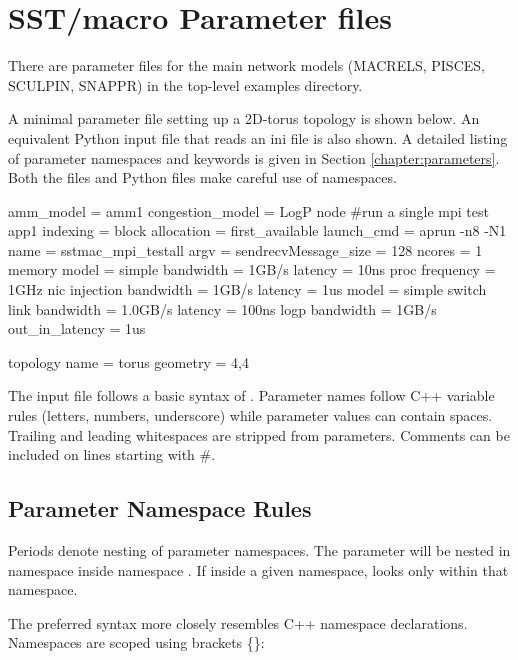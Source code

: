 
\section{SST/macro Parameter files}

There are parameter files for the main network models (MACRELS, PISCES, SCULPIN, SNAPPR) in the top-level examples directory.

\label{sec:parameters}
A minimal parameter file setting up a 2D-torus topology is shown below. 
An equivalent Python input file that reads an ini file is also shown.
A detailed listing of parameter namespaces and keywords is given in Section \ref{chapter:parameters}.
Both the  files and Python files make careful use of namespaces.

\begin{ViFile}
amm_model = amm1
congestion_model = LogP
node {
 #run a single mpi test
 app1 {
  indexing = block
  allocation = first_available
  launch_cmd = aprun -n8 -N1
  name = sstmac_mpi_testall
  argv =
  sendrecvMessage_size = 128
 }
 ncores = 1
 memory {
  model = simple
  bandwidth = 1GB/s
  latency = 10ns
 }
 proc {
  frequency = 1GHz
 }
 nic {
  injection {
   bandwidth = 1GB/s
   latency = 1us
  }
  model = simple
 }
}
switch {
 link {
  bandwidth = 1.0GB/s
   latency = 100ns
 }
 logp {
   bandwidth = 1GB/s
   out_in_latency = 1us
 }
}

topology {
 name = torus
 geometry = 4,4
}
\end{ViFile}
The input file follows a basic syntax of .  
Parameter names follow C++ variable rules (letters, numbers, underscore) while parameter values can contain spaces.  Trailing and leading whitespaces are stripped from parameters.
Comments can be included on lines starting with \#.

\subsection{Parameter Namespace Rules}
\label{subsec:parameterNamespace}
Periods denote nesting of parameter namespaces.
The parameter  will be nested in namespace  inside namespace .
If inside a given namespace, \sstmacro looks only within that namespace.

The preferred syntax more closely resembles C++ namespace declarations. 
Namespaces are scoped using brackets \{\}:

